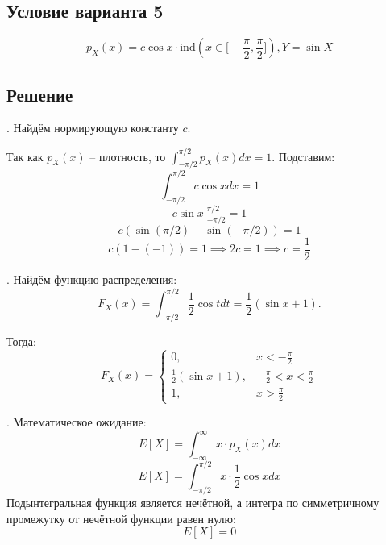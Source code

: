 \documentclass[a4paper,14pt]{extarticle}
\begin{document}
        \subsection*{Условие варианта 5}
        \[p_X(x) = c \cos x \cdot \mathrm{ind}(x \in \big[-\frac{\pi}{2}, \frac{\pi}{2}\big]), Y = \sin X\]
        
        \subsection*{Решение}
        . Найдём нормирующую константу $c$. 

        Так как $p_X(x)$ -- плотность, то $\int_{-\pi/2}^{\pi/2} p_X(x) dx = 1$. Подставим:
        \[\int_{-\pi/2}^{\pi/2} c \cos x dx = 1\]
        \[c \sin x |^{\pi/2}_{-\pi/2} = 1\]
        \[c(\sin(\pi/2) - \sin(-\pi/2)) = 1\]
        \[c(1 - (-1)) = 1 \implies 2c = 1 \implies \boxed{c = \frac{1}{2}}\]
        
        . Найдём функцию распределения:
        \[F_X(x) = \int_{-\pi/2}^{\pi/2}\frac{1}{2}\cos t dt = \frac{1}{2} (\sin x + 1). \]
        
        Тогда: \[ \boxed{F_X (x)= \begin{cases}
            0, & x < -\frac{\pi}{2} \\
            \frac{1}{2} (\sin x + 1), & -\frac{\pi}{2} < x < \frac{\pi}{2} \\
            1, & x > \frac{\pi}{2}
        \end{cases}}\] 

        . Математическое ожидание:
        \[E[X] = \int_{-\infty}^{\infty} x \cdot p_X(x) dx\]
        \[E[X] = \int_{-\pi/2}^{\pi/2} x \cdot \frac{1}{2} \cos x dx\]
        Подынтегральная функция является нечётной, а интегра по симметричному промежутку от нечётной функции равен нулю:
        \[\boxed{E[X] = 0}\]
\end{document}
